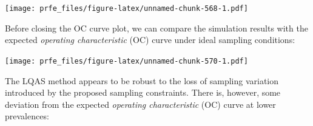 \documentclass[12pt,a4paper]{book}
\newenvironment{Shaded}{\begin{snugshade}}{\end{snugshade}}
\newcommand{\KeywordTok}[1]{\textcolor[rgb]{0.13,0.29,0.53}{\textbf{#1}}}
\newcommand{\DataTypeTok}[1]{\textcolor[rgb]{0.13,0.29,0.53}{#1}}
\newcommand{\DecValTok}[1]{\textcolor[rgb]{0.00,0.00,0.81}{#1}}
\newcommand{\FloatTok}[1]{\textcolor[rgb]{0.00,0.00,0.81}{#1}}
\newcommand{\StringTok}[1]{\textcolor[rgb]{0.31,0.60,0.02}{#1}}
\newcommand{\OtherTok}[1]{\textcolor[rgb]{0.56,0.35,0.01}{#1}}
\newcommand{\OperatorTok}[1]{\textcolor[rgb]{0.81,0.36,0.00}{\textbf{#1}}}
\newcommand{\NormalTok}[1]{#1}
\theoremstyle{definition}
\theoremstyle{definition}
\theoremstyle{definition}
\theoremstyle{remark}
\begin{document}
\texttt{[image: prfe\_files/figure-latex/unnamed-chunk-568-1.pdf]}

Before closing the OC curve plot, we can compare the simulation results
with the expected \emph{operating characteristic} (OC) curve under ideal
sampling conditions:

\begin{Shaded}
\end{Shaded}

\texttt{[image: prfe\_files/figure-latex/unnamed-chunk-570-1.pdf]}

The LQAS method appears to be robust to the loss of sampling variation
introduced by the proposed sampling constraints. There is, however, some
deviation from the expected \emph{operating characteristic} (OC) curve
at lower prevalences:

\begin{Shaded}
\end{Shaded}
\end{document}

